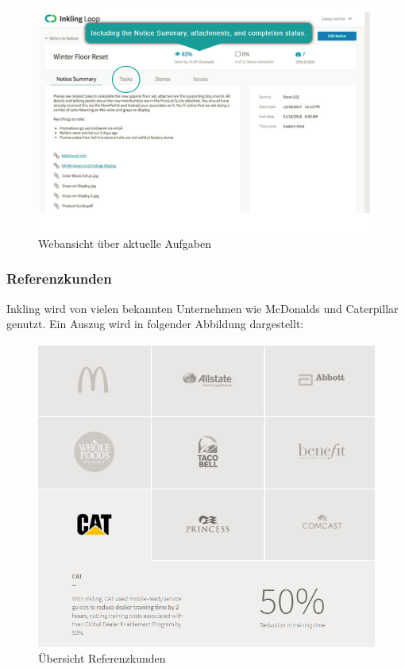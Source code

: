 \begin{figure}[H] 
\centering 
\includegraphics[scale=0.72]{images/inkweb} 
\caption[Webansicht über aktuelle Aufgaben]{Webansicht über aktuelle Aufgaben\protect} 
\label{ws} 
\end{figure}

\subsubsection{Referenzkunden}

Inkling wird von vielen bekannten Unternehmen wie McDonalds und Caterpillar genutzt. Ein Auszug wird in folgender Abbildung dargestellt:

\begin{figure}[H] 
\centering 
\includegraphics[scale=0.72]{images/inkcustomers} 
\caption[Übersicht Referenzkunden]{Übersicht Referenzkunden\protect} 
\label{ws} 
\end{figure}

